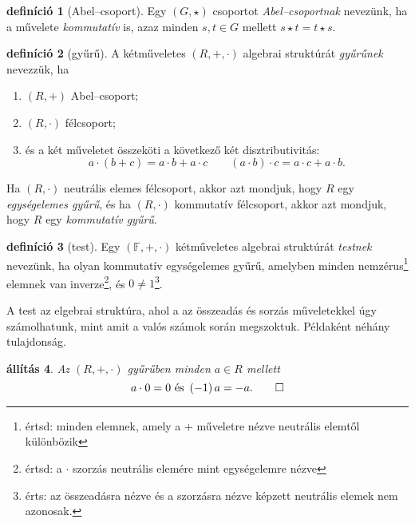 \documentclass[9pt,showtrims]{memoir}
\theoremstyle{plain}
\newtheorem{proposition}{állítás}[chapter]
\theoremstyle{remark}
\theoremstyle{definition}
\newtheorem{definition}[proposition]{definíció}
\begin{document}
\begin{definition}[Abel--csoport]
    Egy $\left( G,\star \right)$ csoportot \emph{Abel--csoportnak} nevezünk,
    ha a művelete \emph{kommutatív} is, 
    azaz minden $s,t\in G$ mellett $s\star t=t\star s$.
\end{definition}
\begin{definition}[gyűrű]
    A kétműveletes $\left( R,+,\cdot \right)$ algebrai struktúrát \emph{gyűrűnek} nevezzük,
    ha
    \begin{enumerate}
        \item $\left( R,+ \right)$ Abel--csoport;
        \item $\left( R,\cdot \right)$ félcsoport;
        \item és a két műveletet összeköti a következő két disztributivitás:
            \[
                a\cdot\left( b+c \right)=a\cdot b + a\cdot c\qquad
                \left( a\cdot b \right)\cdot c=a\cdot c+a\cdot b.
            \]
    \end{enumerate}
    Ha $\left( R,\cdot \right)$ neutrális elemes félcsoport, akkor azt mondjuk, hogy $R$ egy
    \emph{egységelemes gyűrű}, és ha $\left( R,\cdot \right)$ kommutatív félcsoport, akkor
    azt mondjuk, hogy $R$ egy \emph{kommutatív gyűrű}.
\end{definition}
\begin{definition}[test]
    Egy $\left( \mathbb{F},+,\cdot \right)$ kétműveletes algebrai struktúrát \emph{testnek}
    nevezünk, 
    ha olyan kommutatív egységelemes gyűrű, 
    amelyben minden nemzérus\footnote{értsd: minden elemnek, amely a $+$ műveletre nézve neutrális elemtől különbözik}
    elemnek van inverze\footnote{értsd: a $\cdot$ szorzás neutrális elemére mint egységelemre nézve}, 
    és $0\neq 1$\footnote{érts: az összeadásra nézve és a szorzásra nézve képzett neutrális elemek nem azonosak.}.
\end{definition}
A test az elgebrai struktúra, ahol a az összeadás és sorzás műveletekkel úgy számolhatunk, mint amit a valós számok során megszoktuk.
Példaként néhány tulajdonság.
\begin{proposition}
    Az $\left( R,+,\cdot \right)$ gyűrűben minden $a\in R$ mellett 
    \begin{equation*}
        a\cdot 0=0\text{ és }
        \left( -1 \right)a=-a.\qedhere
    \end{equation*}
\end{proposition}
\end{document}
